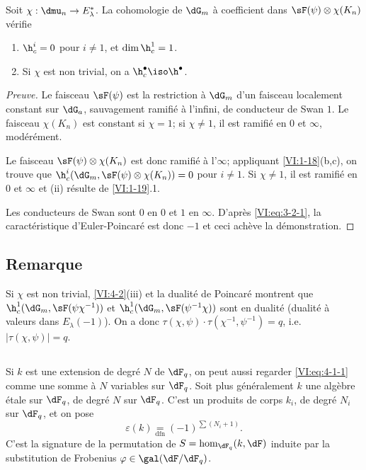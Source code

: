 \begin{proposition_}\label{VI:4-3}
Soit $\chi:\dmu_n \to E_\lambda^\ast$. La cohomologie de $\dG_m$ à 
coefficient dans $\sF(\psi)\otimes \chi(K_n)$ vérifie 
\begin{enumerate}[\indent (i)]
  \item $\h_c^i=0$ pour $i\ne 1$, et $\dim \h_c^1{} = 1$. 
  \item Si $\chi$ est non trivial, on a $\h_c^\bullet{}\iso \h^\bullet{}$. 
\end{enumerate}
\end{proposition_}
\begin{proof}[Preuve]
Le faisceau $\sF(\psi)$ est la restriction à $\dG_m$ d'un faisceau localement 
constant sur $\dG_a$, sauvagement ramifié à l'infini, de conducteur de 
Swan $1$. Le faisceau $\chi(K_n)$ est constant si $\chi=1$; si $\chi\ne 1$, il 
est ramifié en $0$ et $\infty$, modérément. 

Le faisceau $\sF(\psi)\otimes\chi(K_n)$ est donc ramifié à l'$\infty$; 
appliquant \ref{VI:1-18}(b,c), on trouve que 
$\h_c^i(\dG_m,\sF(\psi)\otimes \chi(K_n))=0$ pour $i\ne 1$. Si $\chi\ne 1$, il 
est ramifié en $0$ et $\infty$ et (ii) résulte de \ref{VI:1-19}.1. 

Les conducteurs de Swan sont $0$ en $0$ et $1$ en $\infty$. D'après 
\eqref{VI:eq:3-2-1}, la caractéristique d'Euler-Poincaré est donc $-1$ et 
ceci achève la démonstration. 
\end{proof}





\subsection{Remarque}\label{VI:4-4}

Si $\chi$ est non trivial, \ref{VI:4-2}(iii) et la dualité de Poincaré 
montrent que $\h_c^1(\dG_m,\sF(\psi\chi^{-1}))$ et 
$\h_c^1(\dG_m,\sF(\psi^{-1}\chi))$ sont en dualité (dualité à valeurs 
dans $E_\lambda(-1)$). On a donc 
$\tau(\chi,\psi)\cdot \tau(\chi^{-1},\psi^{-1}) = q$, i.e. 
$|\tau(\chi,\psi)|=q$. 





\subsection{}\label{VI:4-5}

Si $k$ est une extension de degré $N$ de $\dF_q$, on peut aussi regarder 
\eqref{VI:eq:4-1-1} comme une somme à $N$ variables sur $\dF_q$. Soit plus 
généralement $k$ une algèbre étale sur $\dF_q$, de degré $N$ sur 
$\dF_q$. C'est un produits de corps $k_i$, de degré $N_i$ sur $\dF_q$, et on pose 
\begin{equation*}\tag{4.5.1}\label{VI:eq:4-5-1}
  \varepsilon(k) \underset{\mathrm{dfn}}{=} (-1)^{\sum (N_i+1)} \text{.} 
\end{equation*}
C'est la signature de la permutation de $S=\hom_{\dF_q}(k,\dF)$ induite par la 
substitution de Frobenius $\varphi\in \gal(\dF/\dF_q)$. 

